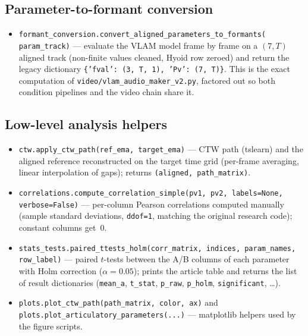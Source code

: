 \documentclass[11pt,a4paper]{article}
\begin{document}
\subsection{Parameter-to-formant conversion}
\begin{itemize}
\item \texttt{formant\_conversion.convert\_aligned\_parameters\_to\_formants(
      param\_track)} --- evaluate the VLAM model frame by frame on a
      $(7, T)$ aligned track (non-finite values cleaned, Hyoid row
      zeroed) and return the legacy dictionary
      \texttt{\{'fval': (3, T, 1), 'Pv': (7, T)\}}. This is the exact
      computation of \texttt{video/vlam\_audio\_maker\_v2.py}, factored
      out so both condition pipelines and the video chain share it.
\end{itemize}

\subsection{Low-level analysis helpers}
\begin{itemize}
\item \texttt{ctw.apply\_ctw\_path(ref\_ema, target\_ema)} --- CTW path
      (tslearn) and the aligned reference reconstructed on the target
      time grid (per-frame averaging, linear interpolation of gaps);
      returns \texttt{(aligned, path\_matrix)}.
\item \texttt{correlations.compute\_correlation\_simple(pv1, pv2,
      labels=None, verbose=False)} --- per-column Pearson correlations
      computed manually (sample standard deviations, \texttt{ddof=1},
      matching the original research code); constant columns get~0.
\item \texttt{stats\_tests.paired\_ttests\_holm(corr\_matrix, indices,
      param\_names, row\_label)} --- paired $t$-tests between the A/B
      columns of each parameter with Holm correction
      ($\alpha = 0.05$); prints the article table and returns the list
      of result dictionaries (\texttt{mean\_a}, \texttt{t\_stat},
      \texttt{p\_raw}, \texttt{p\_holm}, \texttt{significant}, \dots).
\item \texttt{plots.plot\_ctw\_path(path\_matrix, color, ax)} and
      \texttt{plots.plot\_articulatory\_parameters(...)} --- matplotlib
      helpers used by the figure scripts.
\end{itemize}
\end{document}
